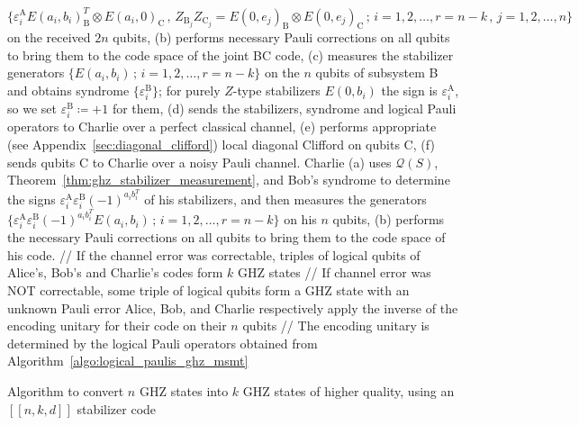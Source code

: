 \documentclass[journal,onecolumn]{IEEEtran}
\newcommand{\llbr}{[\![}
\newcommand{\rrbr}{]\!]}
\begin{document}
\begin{algorithm}
{ $$\{ \varepsilon_i^{\text{A}} E(a_i,b_i)_{\text{B}}^T \otimes E(a_i,0)_{\text{C}} \, , \, Z_{\text{B}_j} Z_{\text{C}_j} = E(0,e_j)_{\text{B}} \otimes E(0,e_j)_{\text{C}} \, ; \, i = 1,2,\ldots,r=n-k \, , \, j = 1,2,\ldots,n \}$$ 
 on the received $2n$ qubits, \;
 (b) performs necessary Pauli corrections on all qubits to bring them to the code space of the joint BC code, \;
 (c) measures the stabilizer generators $\{ E(a_i,b_i) \, ; \, i = 1,2,\ldots,r=n-k \}$ on the $n$ qubits of subsystem B and obtains syndrome $\{ \varepsilon_i^{\text{B}} \}$; for purely $Z$-type stabilizers $E(0,b_i)$ the sign is $\varepsilon_i^{\text{A}}$, so we set $\varepsilon_i^{\text{B}} \coloneqq +1$ for them, \;
(d) sends the stabilizers, syndrome and logical Pauli operators to Charlie over a perfect classical channel, \;
(e) performs appropriate (see Appendix~\ref{sec:diagonal_clifford}) local diagonal Clifford on qubits C, \;
(f) sends qubits C to Charlie over a noisy Pauli channel. \;
  \;
 Charlie \; 
 (a) uses $\mathcal{Q}(S)$, Theorem~\ref{thm:ghz_stabilizer_measurement}, and Bob's syndrome to determine the signs $\varepsilon_i^{\text{A}} \varepsilon_i^{\text{B}} (-1)^{a_i b_i^T}$ of his stabilizers, and then measures the generators $\{ \varepsilon_i^{\text{A}} \varepsilon_i^{\text{B}} (-1)^{a_i b_i^T} E(a_i,b_i) \, ; \, i = 1,2,\ldots,r=n-k \}$ on his $n$ qubits, \;
 (b) performs the necessary Pauli corrections on all qubits to bring them to the code space of his code. \;
  \;
 // If the channel error was correctable, triples of logical qubits of Alice's, Bob's and Charlie's codes form $k$ GHZ states \;
 // If channel error was NOT correctable, some triple of logical qubits form a GHZ state with an unknown Pauli error \;
 Alice, Bob, and Charlie respectively apply the inverse of the encoding unitary for their code on their $n$ qubits\;
 // The encoding unitary is determined by the logical Pauli operators obtained from Algorithm~\ref{algo:logical_paulis_ghz_msmt} \;
}
  \caption{Algorithm to convert $n$ GHZ states into $k$ GHZ states of higher quality, using an $\llbr n,k,d \rrbr$ stabilizer code}
 \label{algo:algo_ghz}
\end{algorithm}
\end{document}
